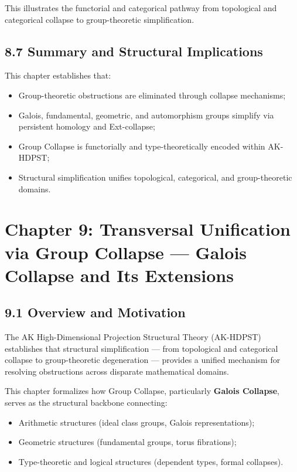 \documentclass[11pt]{article}
\begin{document}
This illustrates the functorial and categorical pathway from topological and categorical collapse to group-theoretic simplification.

\subsection*{8.7 Summary and Structural Implications}

This chapter establishes that:

\begin{itemize}
    \item Group-theoretic obstructions are eliminated through collapse mechanisms;
    \item Galois, fundamental, geometric, and automorphism groups simplify via persistent homology and Ext-collapse;
    \item Group Collapse is functorially and type-theoretically encoded within AK-HDPST;
    \item Structural simplification unifies topological, categorical, and group-theoretic domains.
\end{itemize}



\section{Chapter 9: Transversal Unification via Group Collapse — Galois Collapse and Its Extensions}

\subsection*{9.1 Overview and Motivation}

The AK High-Dimensional Projection Structural Theory (AK-HDPST) establishes that structural simplification — from topological and categorical collapse to group-theoretic degeneration — provides a unified mechanism for resolving obstructions across disparate mathematical domains.

This chapter formalizes how Group Collapse, particularly \textbf{Galois Collapse}, serves as the structural backbone connecting:

\begin{itemize}
    \item Arithmetic structures (ideal class groups, Galois representations);
    \item Geometric structures (fundamental groups, torus fibrations);
    \item Type-theoretic and logical structures (dependent types, formal collapses).
\end{itemize}
\end{document}
